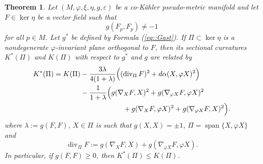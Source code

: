 \documentclass[12pt,a4paper,final]{amsart}
\numberwithin{equation}{section}
\newtheorem{tw}{Theorem}[section]
\theoremstyle{df}
\newcommand{\Span}{\operatorname{span}}
\newcommand{\eps}{\varepsilon}
\begin{document}
\begin{tw}\label{tw::phisectional}
Let $(M,\varphi,\xi,\eta,g,\eps)$ be a co-K\"ahler pseudo-metric manifold and
let $F\in\ker\eta$ be a vector field such that
$$
g(F_p,F_p)\neq -1
$$
for all $p\in M$.
Let
$
g^\ast$ be defined by Formula (\ref{eq::Gast}).
If $\Pi\subset\ker\eta$ is a nondegenerate $\varphi$-invariant plane orthogonal
to $F$, then its sectional curvatures $K^\ast(\Pi)$ and $K(\Pi)$ with respect
to $g^\ast$ and $g$ are related by
\begin{align*}
K^\ast(\Pi)=K(\Pi)
&-\frac{3\lambda}{4(1+\lambda)}
\Bigl((\operatorname{div}_\Pi F)^2+d\alpha(X,\varphi X)^2\Bigr)\\
&-\frac{1}{1+\lambda}\Bigl(
g(\nabla_XF,X)^2+g(\nabla_{\varphi X}F,\varphi X)^2\\
&\qquad\qquad\qquad
+g(\nabla_XF,\varphi X)^2+g(\nabla_{\varphi X}F,X)^2
\Bigr).
\end{align*}
where $\lambda:=g(F,F)$, $X\in\Pi$ is such that
$g(X,X)=\pm1$, $\Pi=\Span\{X,\varphi X\}$
and
$$
\operatorname{div}_\Pi F:=g(\nabla_XF,X)+g(\nabla_{\varphi X}F,\varphi X).
$$
In particular, if $g(F,F)\geq 0$, then $K^\ast(\Pi)\leq K(\Pi)$.
\end{tw}
\end{document}
